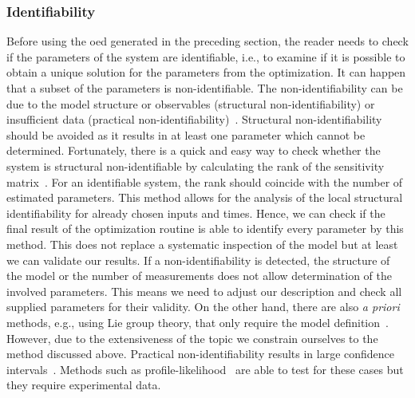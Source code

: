 \documentclass[graybox]{svmult}
\begin{document}
\subsubsection{Identifiability}
Before using the \acl{oed} generated in the preceding section, the reader needs to check if the parameters of the system are identifiable, i.e., to examine if it is possible to obtain a unique solution for the parameters from the optimization.
It can happen that a subset of the parameters is non-identifiable.
The non-identifiability can be due to the model structure or observables (structural non-identifiability) or insufficient data (practical non-identifiability)~\cite{guillaume_introductory_2019, wieland_structural_2021, walter_identifiability_1996}.
Structural non-identifiability should be avoided as it results in at least one parameter which cannot be determined.
Fortunately, there is a quick and easy way to check whether the system is structural non-identifiable by calculating the rank of the sensitivity matrix~\cite{miao_identifiability_2011, stigter_fast_2015}.
For an identifiable system, the rank should coincide with the number of estimated parameters.
This method allows for the analysis of the local structural identifiability for already chosen inputs and times.
Hence, we can check if the final result of the optimization routine is able to identify every parameter by this method.
This does not replace a systematic inspection of the model but at least we can validate our results.
If a non-identifiability is detected, the structure of the model or the number of measurements does not allow determination of the involved parameters.
This means we need to adjust our description and check all supplied parameters for their validity.
On the other hand, there are also {\it a priori} methods, e.g., using Lie group theory, that only require the model definition~\cite{wieland_structural_2021}.
However, due to the extensiveness of the topic we constrain ourselves to the method discussed above.
Practical non-identifiability results in large confidence intervals~\cite{holmberg_practical_1982, miao_identifiability_2011, kreutzProfileLikelihood2013}.
Methods such as profile-likelihood~\cite{wieland_structural_2021} are able to test for these cases but they require experimental data.
%
\end{document}

